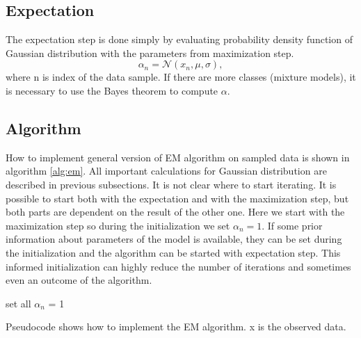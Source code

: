 \subsection{Expectation}
The expectation step is done simply by evaluating probability density function of Gaussian distribution with the parameters from maximization step.
\begin{equation}
\alpha_n = \mathcal{N}(x_n, \mu, \sigma),
\end{equation}
where n is index of the data sample. If there are more classes (mixture models), it is necessary to use the Bayes theorem to compute $\alpha$.

\subsection{Algorithm}
How to implement general version of EM algorithm on sampled data is shown in algorithm \ref{alg:em}. All important calculations for Gaussian distribution are described in previous subsections. It is not clear where to start iterating. It is possible to start both with the expectation and with the maximization step, but both parts are dependent on the result of the other one. Here we start with the maximization step so during the initialization we set $\alpha_n = 1$. If some prior information about parameters of the model is available, they can be set during the initialization and the algorithm can be started with expectation step. This informed initialization can highly reduce the number of iterations and sometimes even an outcome of the algorithm.
\begin{algorithm}[]
 set all $\alpha_n$ = 1\;
 \caption{Pseudocode shows how to implement the EM algorithm. x is the observed data.}
 \label{alg:em}
\end{algorithm}


